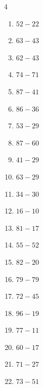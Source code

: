 \begin{multicols}{4}
\begin{enumerate}
  \item $52-22$
        \phantom{$=30$}

  \item $63-43$
        \phantom{$=20$}

  \item $62-43$
        \phantom{$=19$}

  \item $74-71$
        \phantom{$=3$}

  \item $87-41$
        \phantom{$=46$}

  \item $86-36$
        \phantom{$=50$}

  \item $53-29$
        \phantom{$=24$}

  \item $87-60$
        \phantom{$=27$}

  \item $41-29$
        \phantom{$=12$}

  \item $63-29$
        \phantom{$=34$}

  \item $34-30$
        \phantom{$=4$}

\columnbreak %

  \item $16-10$
        \phantom{$=6$}

  \item $81-17$
        \phantom{$=64$}

  \item $55-52$
        \phantom{$=3$}

  \item $82-20$
        \phantom{$=62$}

  \item $79-79$
        \phantom{$=0$}

  \item $72-45$
        \phantom{$=27$}

  \item $96-19$
        \phantom{$=77$}

  \item $77-11$
        \phantom{$=66$}

  \item $60-17$
        \phantom{$=43$}

  \item $71-27$
        \phantom{$=44$}

  \item $73-51$
        \phantom{$=22$}


\end{enumerate}
\end{multicols}
